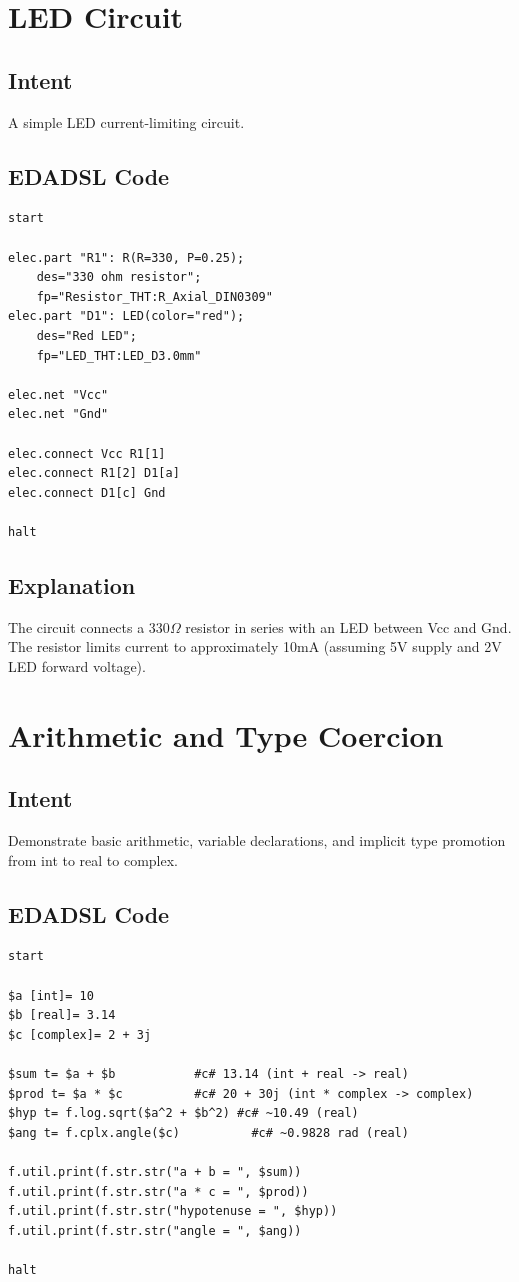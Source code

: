 \section{LED Circuit}
\subsection{Intent}
A simple LED current-limiting circuit.

\subsection{EDADSL Code}
\begin{verbatim}
start

elec.part "R1": R(R=330, P=0.25); 
    des="330 ohm resistor"; 
    fp="Resistor_THT:R_Axial_DIN0309"
elec.part "D1": LED(color="red"); 
    des="Red LED"; 
    fp="LED_THT:LED_D3.0mm"

elec.net "Vcc"
elec.net "Gnd"

elec.connect Vcc R1[1]
elec.connect R1[2] D1[a]
elec.connect D1[c] Gnd

halt
\end{verbatim}

\subsection{Explanation}
The circuit connects a 330$\Omega$ resistor in series with an LED between Vcc and Gnd. The resistor limits current to approximately 10mA (assuming 5V supply and 2V LED forward voltage).

\section{Arithmetic and Type Coercion}
\subsection{Intent}
Demonstrate basic arithmetic, variable declarations, and implicit type promotion from int to real to complex.

\subsection{EDADSL Code}
\begin{verbatim}
start

$a [int]= 10
$b [real]= 3.14
$c [complex]= 2 + 3j

$sum t= $a + $b           #c# 13.14 (int + real -> real)
$prod t= $a * $c          #c# 20 + 30j (int * complex -> complex)
$hyp t= f.log.sqrt($a^2 + $b^2) #c# ~10.49 (real)
$ang t= f.cplx.angle($c)          #c# ~0.9828 rad (real)

f.util.print(f.str.str("a + b = ", $sum))
f.util.print(f.str.str("a * c = ", $prod))
f.util.print(f.str.str("hypotenuse = ", $hyp))
f.util.print(f.str.str("angle = ", $ang))

halt
\end{verbatim}


